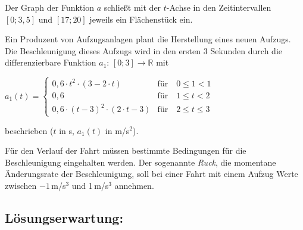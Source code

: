 \begin{langesbeispiel}
\begin{aufgabenstellung}
\item %


Der Graph der Funktion $a$ schließt mit der $t$-Achse in den Zeitintervallen $[0;3,5]$ und $[17;20]$ jeweils ein Flächenstück ein.


\item Ein Produzent von Aufzugsanlagen plant die Herstellung eines neuen Aufzugs.\\
	Die Beschleunigung dieses Aufzugs wird in den ersten 3 Sekunden durch die differenzierbare Funktion $a_1$: $[0;3]\rightarrow \mathbb{R}$ mit
	
	$a_1(t)=\begin{cases}
	0,6\cdot t^2\cdot(3-2\cdot t)&\text{für}\quad 0\leq 1<1\\
	0,6&\text{für}\quad 1\leq t<2\\	
	0,6\cdot(t-3)^2\cdot(2\cdot t-3)&\text{für}\quad 2\leq t\leq 3
	\end{cases}$
	
	beschrieben ($t$ in s, $a_1(t)$ in m/s$^2$).%


Für den Verlauf der Fahrt müssen bestimmte Bedingungen für die Beschleunigung eingehalten werden. Der sogenannte \textit{Ruck}, die momentane Änderungsrate der Beschleunigung, soll bei einer Fahrt mit einem Aufzug Werte zwischen $-1$\,m/s$^3$ und 1\,m/s$^3$ annehmen.


\end{aufgabenstellung}

\begin{loesung}
\item \subsection{Lösungserwartung:} 

\end{loesung}
\end{langesbeispiel}

